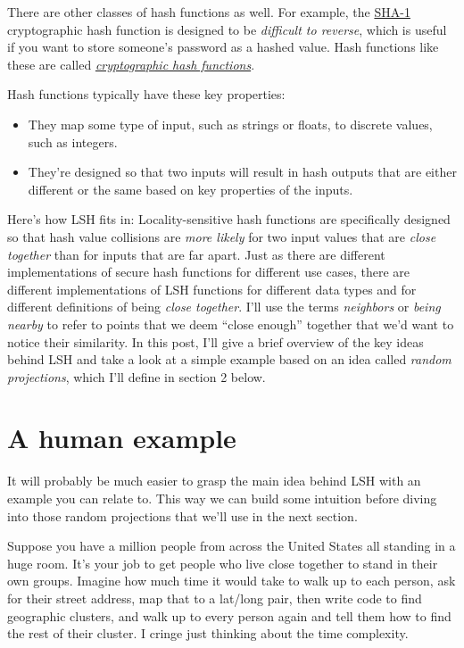 \documentclass[20pt,]{extarticle}
\providecommand{\tightlist}{%
  \setlength{\itemsep}{0pt}\setlength{\parskip}{0pt}}
\begin{document}
There are other classes of hash functions as well. For example, the
\href{https://en.wikipedia.org/wiki/SHA-1}{SHA-1} cryptographic hash
function is designed to be \emph{difficult to reverse}, which is useful
if you want to store someone's password as a hashed value. Hash
functions like these are called
\href{https://en.wikipedia.org/wiki/Cryptographic_hash_function}{\emph{cryptographic
hash functions}}.

Hash functions typically have these key properties:

\begin{itemize}
\tightlist
\item
  They map some type of input, such as strings or floats, to discrete
  values, such as integers.
\item
  They're designed so that two inputs will result in hash outputs that
  are either different or the same based on key properties of the
  inputs.
\end{itemize}

Here's how LSH fits in: Locality-sensitive hash functions are
specifically designed so that hash value collisions are \emph{more
likely} for two input values that are \emph{close together} than for
inputs that are far apart. Just as there are different implementations
of secure hash functions for different use cases, there are different
implementations of LSH functions for different data types and for
different definitions of being \emph{close together}. I'll use the terms
\emph{neighbors} or \emph{being nearby} to refer to points that we deem
``close enough'' together that we'd want to notice their similarity. In
this post, I'll give a brief overview of the key ideas behind LSH and
take a look at a simple example based on an idea called \emph{random
projections}, which I'll define in section 2 below.

\section{A human example}\label{a-human-example}

It will probably be much easier to grasp the main idea behind LSH with
an example you can relate to. This way we can build some intuition
before diving into those random projections that we'll use in the next
section.

Suppose you have a million people from across the United States all
standing in a huge room. It's your job to get people who live close
together to stand in their own groups. Imagine how much time it would
take to walk up to each person, ask for their street address, map that
to a lat/long pair, then write code to find geographic clusters, and
walk up to every person again and tell them how to find the rest of
their cluster. I cringe just thinking about the time complexity.
\end{document}
